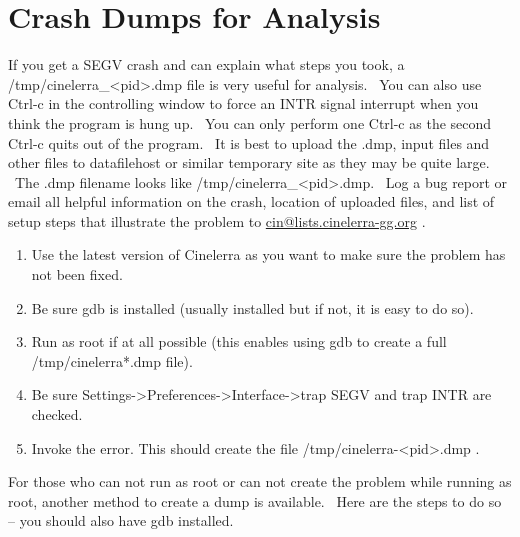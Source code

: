 \section{Crash Dumps for Analysis}%
\label{cha:Crash Dumps for Analysis}
If you get a SEGV crash and can explain what steps you took, a /tmp/cinelerra\_{\textless}pid{\textgreater}.dmp file is
very useful for analysis. \ You can also use Ctrl-c in the controlling window to force an INTR signal interrupt when
you think the program is hung up. \ You can only perform one Ctrl-c as the second Ctrl-c quits out of the program. \ It
is best to upload the .dmp, input files and other files to datafilehost or similar temporary site as they may be quite
large. \ The .dmp filename looks like /tmp/cinelerra\_{\textless}pid{\textgreater}.dmp. \ Log a bug report or email all
helpful information on the crash, location of uploaded files, and list of setup steps that illustrate the problem to
\href{mailto:cin@lists.cinelerra-gg.org}{cin@lists.cinelerra-gg.org} .
\medskip

\begin{enumerate}[nosep]
	\item Use the latest version of Cinelerra as you want to make sure the problem has not been fixed.
	\item Be sure gdb is installed (usually installed but if not, it is easy to do so).
    \item Run as root if at all possible (this enables using gdb to create a full /tmp/cinelerra*.dmp file).
    \item Be sure Settings-{\textgreater}Preferences-{\textgreater}Interface-{\textgreater}trap SEGV and trap INTR are checked.
	\item Invoke the error. This should create the file /tmp/cinelerra-{\textless}pid{\textgreater}.dmp .
\end{enumerate}
\medskip

For those who can not run as root or can not create the problem while running as root, another method to create a dump
is available. \ Here are the steps to do so -- you should also have gdb installed.
\medskip

